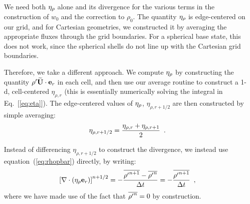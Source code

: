 We need both $\eta_{\rho}$ alone and its divergence for the
various terms in the construction of $w_0$ and the correction to
$\rho_0$.  The quantity $\eta_{\rho}$ is edge-centered on our grid, and
for Cartesian geometries, we constructed it by averaging the
appropriate fluxes through the grid boundaries.  For a spherical base
state, this does not work, since the spherical shells do not line up
with the Cartesian grid boundaries.

Therefore, we take a different approach.  We compute $\eta_{\rho}$ by
constructing the quantity ${\rho^{\prime}} \widetilde{{\bf U}} \cdot \mathbf{e}_r$ in each cell, and then
use our average routine to construct a 1-d, cell-centered
$\eta_{\rho,r}$ (this is essentially numerically solving the integral
in Eq.~[\ref{eq:eta}]).  The edge-centered values of $\eta_{\rho}$,
$\eta_{\rho,r+1/2}$ are then constructed by simple
averaging: 
\begin{equation}
\eta_{\rho,r+1/2} = \frac{\eta_{\rho,r} + \eta_{\rho,r+1}}{2} \enskip .
\end{equation}

Instead of differencing $\eta_{\rho,r+1/2}$ to construct the 
divergence, we instead use equation~(\ref{eq:rhopbar}) directly, by writing:
\begin{equation}
\left [ \nabla \cdot (\eta_{\rho} \mathbf{e}_r ) \right ]^{n+1/2}
= - \frac{\overline{{\rho^{\prime}}^{n+1}} - \overline{{\rho^{\prime}}^n}}{\Delta t}
= - \frac{\overline{{\rho^{\prime}}^{n+1}}}{\Delta t} \enskip ,
\end{equation}
where we have made use of the fact that $\overline{{\rho^{\prime}}^n} = 0$ by construction.


